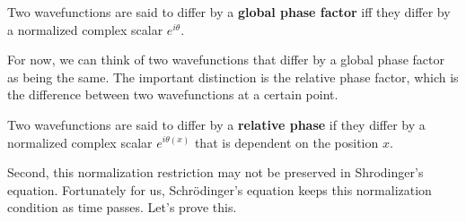 \documentclass{article}
\begin{document}
    \begin{definition}
      Two wavefunctions are said to differ by a \textbf{global phase factor} iff they differ by a normalized complex scalar $e^{i \theta}$.  
    \end{definition}

    For now, we can think of two wavefunctions that differ by a global phase factor as being the same. The important distinction is the relative phase factor, which is the difference between two wavefunctions at a certain point. 

    \begin{definition}
      Two wavefunctions are said to differ by a \textbf{relative phase} if they differ by a normalized complex scalar $e^{i \theta(x)}$ that is dependent on the position $x$.
    \end{definition}

    Second, this normalization restriction may not be preserved in Shrodinger's equation. Fortunately for us, Schr\"odinger's equation keeps this normalization condition as time passes. Let's prove this. 
\end{document}

